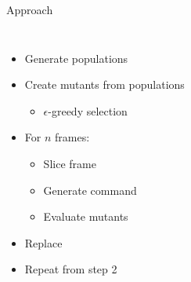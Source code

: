 \documentclass{beamer}
\begin{document}
	\begin{frame}{Approach}

		\begin{columns}[c c]
		
			\vspace{-2cm}
			
			\begin{itemize}

			\item Generate populations

			\item Create mutants from populations
				\begin{itemize}
				\item $\epsilon$-greedy selection
				\end{itemize}

			\item For $n$ frames:
				\begin{itemize}
				\item Slice frame
				\item Generate command
				\item Evaluate mutants
				\end{itemize}

			\item Replace
			
			\item Repeat from step 2

			\end{itemize}

%
%		
%				
%		
%			
%			
%
%




\end{columns}
\end{frame}
\end{document}
